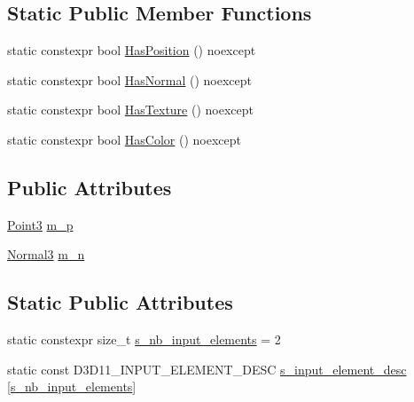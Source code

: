\subsection*{Static Public Member Functions}
\begin{DoxyCompactItemize}
\item 
static constexpr bool \hyperlink{structmage_1_1_vertex_position_normal_a0a356004bb83c2616704bfbe63d936a7}{Has\+Position} () noexcept
\item 
static constexpr bool \hyperlink{structmage_1_1_vertex_position_normal_a28b610b6d83944e77983262869c5aaa1}{Has\+Normal} () noexcept
\item 
static constexpr bool \hyperlink{structmage_1_1_vertex_position_normal_a049430623134ff702e768bda3bc96860}{Has\+Texture} () noexcept
\item 
static constexpr bool \hyperlink{structmage_1_1_vertex_position_normal_a6bd96547f8a39dd0fa0ecd2b478f7213}{Has\+Color} () noexcept
\end{DoxyCompactItemize}
\subsection*{Public Attributes}
\begin{DoxyCompactItemize}
\item 
\hyperlink{structmage_1_1_point3}{Point3} \hyperlink{structmage_1_1_vertex_position_normal_abe9d881b1ebe279ccfb70c94a441e162}{m\+\_\+p}
\item 
\hyperlink{structmage_1_1_normal3}{Normal3} \hyperlink{structmage_1_1_vertex_position_normal_a5b687f150537e625dcca810d3fded3e6}{m\+\_\+n}
\end{DoxyCompactItemize}
\subsection*{Static Public Attributes}
\begin{DoxyCompactItemize}
\item 
static constexpr size\+\_\+t \hyperlink{structmage_1_1_vertex_position_normal_a0c92f3814b7ce5f1f861498a42926374}{s\+\_\+nb\+\_\+input\+\_\+elements} = 2
\item 
static const D3\+D11\+\_\+\+I\+N\+P\+U\+T\+\_\+\+E\+L\+E\+M\+E\+N\+T\+\_\+\+D\+E\+SC \hyperlink{structmage_1_1_vertex_position_normal_aa597c602ce172e523bece0e75d157081}{s\+\_\+input\+\_\+element\+\_\+desc} \mbox{[}\hyperlink{structmage_1_1_vertex_position_normal_a0c92f3814b7ce5f1f861498a42926374}{s\+\_\+nb\+\_\+input\+\_\+elements}\mbox{]}
\end{DoxyCompactItemize}


